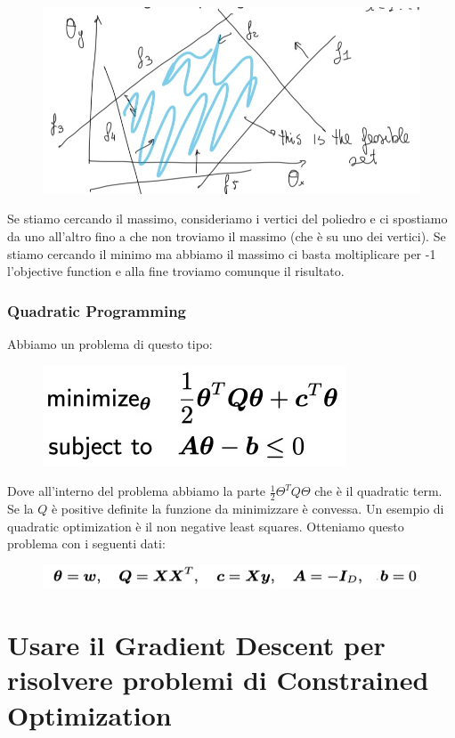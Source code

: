 \documentclass[14pt]{extreport}
\begin{document}
\begin{figure}[H]
\centering
\includegraphics[width=0.6\linewidth]{279.jpeg}
\end{figure}

Se stiamo cercando il massimo, consideriamo i vertici del poliedro e ci spostiamo da uno all'altro fino a che non troviamo il massimo (che è su uno
dei vertici). Se stiamo cercando il minimo ma abbiamo il massimo ci basta moltiplicare per -1 l'objective function e alla fine troviamo comunque il
risultato.

\subsubsection{Quadratic Programming}

Abbiamo un problema di questo tipo:

\begin{figure}[H]
\centering
\includegraphics[width=0.4\linewidth]{280.jpeg}
\end{figure}

Dove all'interno del problema abbiamo la parte $\frac{1}{2}\Theta^TQ\Theta$ che è il quadratic term. Se la $Q$ è positive definite la funzione da
minimizzare è convessa. Un esempio di quadratic optimization è il non negative least squares. Otteniamo questo problema con i seguenti dati:

\begin{figure}[H]
\centering
\includegraphics[width=0.7\linewidth]{281.jpeg}
\end{figure}

\section{Usare il Gradient Descent per risolvere problemi di Constrained Optimization}
\end{document}
